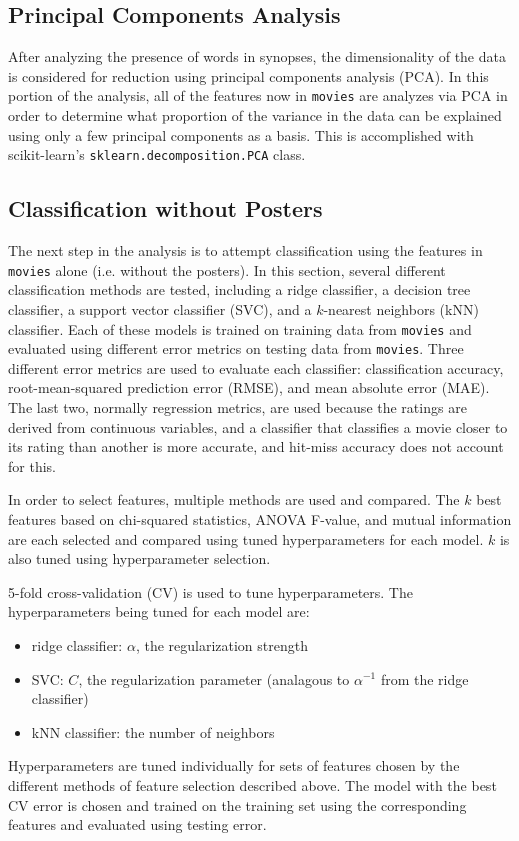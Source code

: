 \documentclass[12pt, oneside]{article}   	%
\begin{document}
\subsection{Principal Components Analysis}
\label{section:pca}

After analyzing the presence of words in synopses, the dimensionality of the data is considered for reduction using principal components analysis (PCA). In this portion of the analysis, all of the features now in \texttt{movies} are analyzes via PCA in order to determine what proportion of the variance in the data can be explained using only a few principal components as a basis. This is accomplished with scikit-learn's \texttt{sklearn.decomposition.PCA} class.

\subsection{Classification without Posters}
\label{section:class_no_posters}

The next step in the analysis is to attempt classification using the features in \texttt{movies} alone (i.e. without the posters). In this section, several different classification methods are tested, including a ridge classifier, a decision tree classifier, a support vector classifier (SVC), and a $k$-nearest neighbors (kNN) classifier. Each of these models is trained on training data from \texttt{movies} and evaluated using different error metrics on testing data from \texttt{movies}. Three different error metrics are used to evaluate each classifier: classification accuracy, root-mean-squared prediction error (RMSE), and mean absolute error (MAE). The last two, normally regression metrics, are used because the ratings are derived from continuous variables, and a classifier that classifies a movie closer to its rating than another is more accurate, and hit-miss accuracy does not account for this.

In order to select features, multiple methods are used and compared. The $k$ best features based on chi-squared statistics, ANOVA F-value, and mutual information are each selected and compared using tuned hyperparameters for each model. $k$ is also tuned using hyperparameter selection.

5-fold cross-validation (CV) is used to tune hyperparameters. The hyperparameters being tuned for each model are:
\begin{itemize}
\item ridge classifier: $\alpha$, the regularization strength
\item SVC: $C$, the regularization parameter (analagous to $\alpha^{-1}$ from the ridge classifier)
\item kNN classifier: the number of neighbors
\end{itemize}
Hyperparameters are tuned individually for sets of features chosen by the different methods of feature selection described above. The model with the best CV error is chosen and trained on the training set using the corresponding features and evaluated using testing error.
\end{document}
